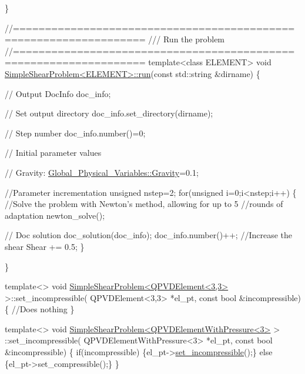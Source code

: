 \begin{DoxyCodeInclude}
{{\}
 

\textcolor{comment}{//==================================================================}\textcolor{comment}{}
\textcolor{comment}{/// Run the problem}
\textcolor{comment}{}\textcolor{comment}{//==================================================================}
\textcolor{keyword}{template}<\textcolor{keyword}{class} ELEMENT>
\textcolor{keywordtype}{void} \hyperlink{classSimpleShearProblem_ac1746a2634e310571d40d70719d509c0}{SimpleShearProblem<ELEMENT>::run}(\textcolor{keyword}{const} std::string &dirname)
\{

 \textcolor{comment}{// Output}
 DocInfo doc\_info;
 
 \textcolor{comment}{// Set output directory}
 doc\_info.set\_directory(dirname);

 \textcolor{comment}{// Step number}
 doc\_info.number()=0;
 
 \textcolor{comment}{// Initial parameter values}
 
 \textcolor{comment}{// Gravity:}
 \hyperlink{namespaceGlobal__Physical__Variables_a8b80d3e8d63b8d0a0ed435a2dd7fe2ad}{Global\_Physical\_Variables::Gravity}=0.1; 
 
 \textcolor{comment}{//Parameter incrementation}
 \textcolor{keywordtype}{unsigned} nstep=2; 
 \textcolor{keywordflow}{for}(\textcolor{keywordtype}{unsigned} i=0;i<nstep;i++)
  \{
   \textcolor{comment}{//Solve the problem with Newton's method, allowing for up to 5 }
   \textcolor{comment}{//rounds of adaptation}
   newton\_solve();

   \textcolor{comment}{// Doc solution}
   doc\_solution(doc\_info);
   doc\_info.number()++;
   \textcolor{comment}{//Increase the shear}
   Shear += 0.5;
  \}

\}

\textcolor{keyword}{template}<>
\textcolor{keywordtype}{void} \hyperlink{classSimpleShearProblem}{SimpleShearProblem<QPVDElement<3,3>} >::set\_incompressible(
 QPVDElement<3,3> *el\_pt, \textcolor{keyword}{const} \textcolor{keywordtype}{bool} &incompressible)
\{
 \textcolor{comment}{//Does nothing}
\}


\textcolor{keyword}{template}<>
\textcolor{keywordtype}{void} \hyperlink{classSimpleShearProblem}{SimpleShearProblem<QPVDElementWithPressure<3>} >
      ::set\_incompressible(
 QPVDElementWithPressure<3> *el\_pt, \textcolor{keyword}{const} \textcolor{keywordtype}{bool} &incompressible)
\{
 \textcolor{keywordflow}{if}(incompressible) \{el\_pt->\hyperlink{classSimpleShearProblem_a3e5d5f57fc041531ee683f50395536f0}{set\_incompressible}();\}
 \textcolor{keywordflow}{else} \{el\_pt->set\_compressible();\}
\}

}}
\end{DoxyCodeInclude}
